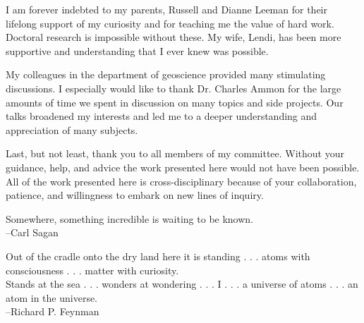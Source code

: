 \documentclass[11pt]{psuthesis}
\begin{document}
\begin{frontmatter}
\tables


\acknowledgments  

I am forever indebted to my parents, Russell and Dianne Leeman for their lifelong support of my curiosity and for teaching me the value of hard work. Doctoral research is impossible without these. My wife, Lendi, has been more supportive and understanding that I ever knew was possible. 

My colleagues in the department of geoscience provided many stimulating discussions. I especially would like to thank Dr. Charles Ammon for the large amounts of time we spent in discussion on many topics and side projects. Our talks broadened my interests and led me to a deeper understanding and appreciation of many subjects.

Last, but not least, thank you to all members of my committee. Without your guidance, help, and advice the work presented here would not have been possible. All of the work presented here is cross-disciplinary because of your collaboration, patience, and willingness to embark on new lines of inquiry.


\clearpage

\vspace*{2.0truein}

\parbox{4.0truein}{
\par\noindent
Somewhere, something incredible is waiting to be known.\\
\hspace*{\fill}--Carl Sagan
}

\vspace{4pc}

\parbox{4.0truein}{
\par\noindent
Out of the cradle onto the dry land here it is standing . . . atoms with consciousness . . . matter with curiosity.\\
Stands at the sea . . . wonders at wondering . . . I . . . a universe of atoms . . . an atom in the universe.\\
\hspace*{\fill}--Richard P. Feynman
}
\end{frontmatter}








\end{document}
